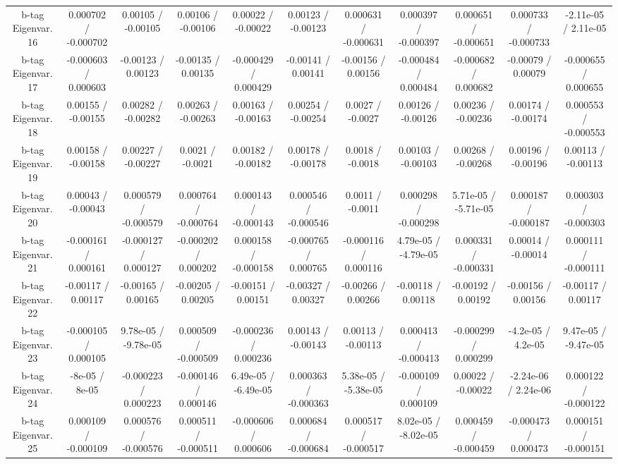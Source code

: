 \begin{table}[htbp]
\begin{center}
\begin{tabular}{|c|c|c|c|c|c|c|c|c|c|c|}
  b-tag Eigenvar. 16 & 0.000702 / -0.000702 & 0.00105 / -0.00105 & 0.00106 / -0.00106 & 0.00022 / -0.00022 & 0.00123 / -0.00123 & 0.000631 / -0.000631 & 0.000397 / -0.000397 & 0.000651 / -0.000651 & 0.000733 / -0.000733 & -2.11e-05 / 2.11e-05 \\ 
  b-tag Eigenvar. 17 & -0.000603 / 0.000603 & -0.00123 / 0.00123 & -0.00135 / 0.00135 & -0.000429 / 0.000429 & -0.00141 / 0.00141 & -0.00156 / 0.00156 & -0.000484 / 0.000484 & -0.000682 / 0.000682 & -0.00079 / 0.00079 & -0.000655 / 0.000655 \\ 
  b-tag Eigenvar. 18 & 0.00155 / -0.00155 & 0.00282 / -0.00282 & 0.00263 / -0.00263 & 0.00163 / -0.00163 & 0.00254 / -0.00254 & 0.0027 / -0.0027 & 0.00126 / -0.00126 & 0.00236 / -0.00236 & 0.00174 / -0.00174 & 0.000553 / -0.000553 \\ 
  b-tag Eigenvar. 19 & 0.00158 / -0.00158 & 0.00227 / -0.00227 & 0.0021 / -0.0021 & 0.00182 / -0.00182 & 0.00178 / -0.00178 & 0.0018 / -0.0018 & 0.00103 / -0.00103 & 0.00268 / -0.00268 & 0.00196 / -0.00196 & 0.00113 / -0.00113 \\ 
  b-tag Eigenvar. 20 & 0.00043 / -0.00043 & 0.000579 / -0.000579 & 0.000764 / -0.000764 & 0.000143 / -0.000143 & 0.000546 / -0.000546 & 0.0011 / -0.0011 & 0.000298 / -0.000298 & 5.71e-05 / -5.71e-05 & 0.000187 / -0.000187 & 0.000303 / -0.000303 \\ 
  b-tag Eigenvar. 21 & -0.000161 / 0.000161 & -0.000127 / 0.000127 & -0.000202 / 0.000202 & 0.000158 / -0.000158 & -0.000765 / 0.000765 & -0.000116 / 0.000116 & 4.79e-05 / -4.79e-05 & 0.000331 / -0.000331 & 0.00014 / -0.00014 & 0.000111 / -0.000111 \\ 
  b-tag Eigenvar. 22 & -0.00117 / 0.00117 & -0.00165 / 0.00165 & -0.00205 / 0.00205 & -0.00151 / 0.00151 & -0.00327 / 0.00327 & -0.00266 / 0.00266 & -0.00118 / 0.00118 & -0.00192 / 0.00192 & -0.00156 / 0.00156 & -0.00117 / 0.00117 \\ 
  b-tag Eigenvar. 23 & -0.000105 / 0.000105 & 9.78e-05 / -9.78e-05 & 0.000509 / -0.000509 & -0.000236 / 0.000236 & 0.00143 / -0.00143 & 0.00113 / -0.00113 & 0.000413 / -0.000413 & -0.000299 / 0.000299 & -4.2e-05 / 4.2e-05 & 9.47e-05 / -9.47e-05 \\ 
  b-tag Eigenvar. 24 & -8e-05 / 8e-05 & -0.000223 / 0.000223 & -0.000146 / 0.000146 & 6.49e-05 / -6.49e-05 & 0.000363 / -0.000363 & 5.38e-05 / -5.38e-05 & -0.000109 / 0.000109 & 0.00022 / -0.00022 & -2.24e-06 / 2.24e-06 & 0.000122 / -0.000122 \\ 
  b-tag Eigenvar. 25 & 0.000109 / -0.000109 & 0.000576 / -0.000576 & 0.000511 / -0.000511 & -0.000606 / 0.000606 & 0.000684 / -0.000684 & 0.000517 / -0.000517 & 8.02e-05 / -8.02e-05 & 0.000459 / -0.000459 & -0.000473 / 0.000473 & 0.000151 / -0.000151 \\ 

\end{tabular}
\end{center}
\end{table}
